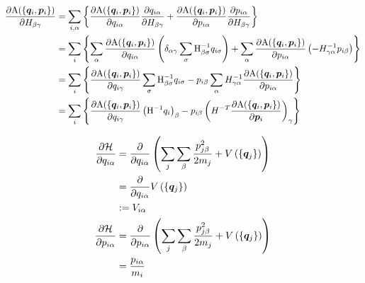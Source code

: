 \documentclass[11pt,a4paper,uplatex]{jsarticle}
\begin{document}
\begin{align}
    \frac{\partial {\rm A}(\{\bm{q}_{i}, \bm{p}_{i}\})}{\partial H_{\beta \gamma}}  &= \sum_{i, \alpha} \left\{ \frac{\partial {\rm A}(\{\bm{q}_{i}, \bm{p}_{i}\})}{\partial q_{i \alpha}} \frac{\partial q_{i \alpha}}{\partial H_{\beta \gamma}} 
    +  \frac{\partial {\rm A}(\{\bm{q}_{i}, \bm{p}_{i}\})}{\partial p_{i \alpha}} \frac{\partial p_{i \alpha}}{\partial H_{\beta \gamma}} \right\} \\
    &= \sum_{i} \left\{ \sum_{\alpha} \frac{\partial {\rm A}(\{\bm{q}_{i}, \bm{p}_{i}\})}{\partial q_{i \alpha}} \left( \delta_{\alpha \gamma} \sum_{\sigma} {\rm H}^{-1}_{\beta \sigma} q_{i \sigma} \right) + \sum_{\alpha} \frac{\partial {\rm A}(\{\bm{q}_{i}, \bm{p}_{i}\})}{\partial p_{i \alpha}} \left(-H_{\gamma \alpha}^{-1} p_{i\beta} \right) \right\} \\
    &= \sum_{i} \left\{ \frac{\partial {\rm A}(\{\bm{q}_{i}, \bm{p}_{i}\})}{\partial q_{i \gamma}} \sum_{\sigma} {\rm H}^{-1}_{\beta \sigma} q_{i \sigma} 
    -  p_{i\beta} \sum_{\alpha} H_{\gamma \alpha}^{-1} \frac{\partial {\rm A}(\{\bm{q}_{i}, \bm{p}_{i}\})}{\partial p_{i \alpha}} \right\} \\
    &= \sum_{i} \left\{ \frac{\partial {\rm A}(\{\bm{q}_{i}, \bm{p}_{i}\})}{\partial q_{i \gamma}} \left({\rm H}^{-1} q_{i}\right)_{\beta}
    -  p_{i \beta} \left( H^{-T} \frac{\partial {\rm A}(\{\bm{q}_{i}, \bm{p}_{i}\})}{\partial \bm{p}_{i}}  \right)_{\gamma} \right\}
\end{align}

\begin{align}
    \frac{\partial {\cal H}}{\partial q_{i \alpha}} &= \frac{\partial}{\partial q_{i \alpha}} \left( \sum_{j} \sum_{\beta}\frac{p_{j \beta}^{2}}{2m_{j}} + V \left(\{\bm{q}_{j}\}\right)\right) \\
    &= \frac{\partial}{\partial q_{i \alpha}} V \left(\{\bm{q}_{j}\}\right) \\
    &:= V_{i \alpha} \\
    \frac{\partial {\cal H}}{\partial p_{i \alpha}} &= \frac{\partial}{\partial p_{i \alpha}} \left( \sum_{j} \sum_{\beta}\frac{p_{j \beta}^{2}}{2m_{j}} + V \left(\{\bm{q}_{j}\}\right)\right) \\
    &= \frac{p_{i \alpha}}{m_{i}}
\end{align}
\end{document}
